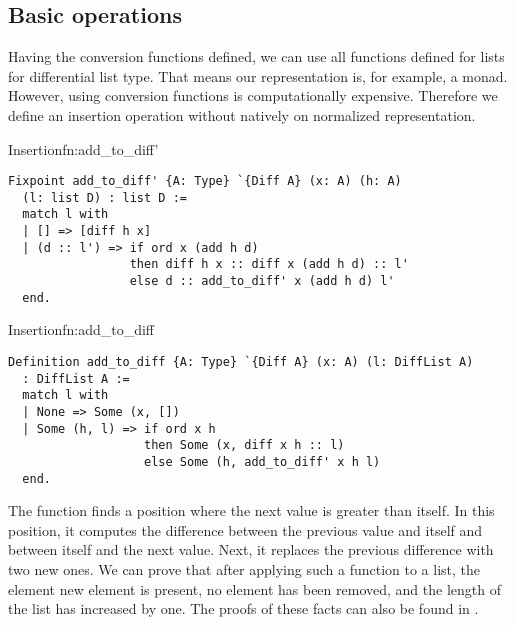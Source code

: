 \subsection{Basic operations}
Having the conversion functions defined, we can use all functions defined for lists for differential list type. That means our representation is, for example, a monad. However, using conversion functions is computationally expensive. Therefore we define an insertion operation without natively on normalized representation.
\begin{func}{Insertion}{fn:add_to_diff'}
\begin{verbatim}
Fixpoint add_to_diff' {A: Type} `{Diff A} (x: A) (h: A) 
  (l: list D) : list D :=
  match l with
  | [] => [diff h x]
  | (d :: l') => if ord x (add h d)
                 then diff h x :: diff x (add h d) :: l'
                 else d :: add_to_diff' x (add h d) l'
  end.
\end{verbatim}
\end{func}
\begin{func}{Insertion}{fn:add_to_diff}
\begin{verbatim}
Definition add_to_diff {A: Type} `{Diff A} (x: A) (l: DiffList A) 
  : DiffList A :=
  match l with
  | None => Some (x, [])
  | Some (h, l) => if ord x h
                   then Some (x, diff x h :: l)
                   else Some (h, add_to_diff' x h l)
  end.
\end{verbatim}
\end{func}
The function  finds a position where the next value is greater than itself. In this position, it computes the difference between the previous value and itself and between itself and the next value. Next, it replaces the previous difference with two new ones. We can prove that after applying such a function to a list, the element new element is present, no element has been removed, and the length of the list has increased by one. The proofs of these facts can also be found in .

